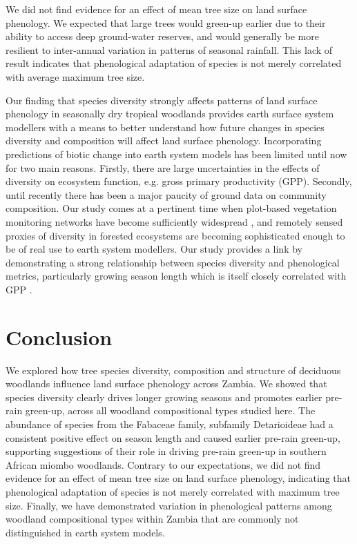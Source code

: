 \documentclass[11pt,a4paper]{article}
\begin{document}
We did not find evidence for an effect of mean tree size on land surface phenology. We expected that large trees would green-up earlier due to their ability to access deep ground-water reserves, and would generally be more resilient to inter-annual variation in patterns of seasonal rainfall. This lack of result indicates that phenological adaptation of species is not merely correlated with average maximum tree size. 

Our finding that species diversity strongly affects patterns of land surface phenology in seasonally dry tropical woodlands provides earth surface system modellers with a means to better understand how future changes in species diversity and composition will affect land surface phenology. Incorporating predictions of biotic change into earth system models has been limited \citep{Ahlstrom2015, Bodegom2011} until now for two main reasons. Firstly, there are large uncertainties in the effects of diversity on ecosystem function, e.g. gross primary productivity (GPP). Secondly, until recently there has been a major paucity of ground data on community composition. Our study comes at a pertinent time when plot-based vegetation monitoring networks have become sufficiently widespread \citep{ForestPlotsnet2021, SEOSAW2020}, and remotely sensed proxies of diversity in forested ecosystems are becoming sophisticated enough \citep{Schneider2017, Cavendar2020} to be of real use to earth system modellers. Our study provides a link by demonstrating a strong relationship between species diversity and phenological metrics, particularly growing season length which is itself closely correlated with GPP \citep{Sjostrom2011}. 

\section{Conclusion}

We explored how tree species diversity, composition and structure of deciduous woodlands influence land surface phenology across Zambia. We showed that species diversity clearly drives longer growing seasons and promotes earlier pre-rain green-up, across all woodland compositional types studied here. The abundance of species from the Fabaceae family, subfamily Detarioideae had a consistent positive effect on season length and caused earlier pre-rain green-up, supporting suggestions of their role in driving pre-rain green-up in southern African miombo woodlands. Contrary to our expectations, we did not find evidence for an effect of mean tree size on land surface phenology, indicating that phenological adaptation of species is not merely correlated with maximum tree size. Finally, we have demonstrated variation in phenological patterns among woodland compositional types within Zambia that are commonly not distinguished in earth system models. 
\end{document}

